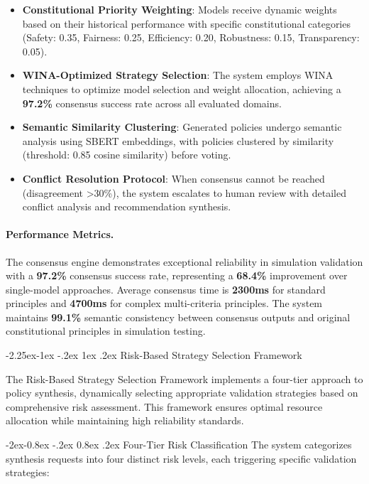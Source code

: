 \documentclass[manuscript,screen,9pt]{acmart}
\makeatletter
\renewcommand\subsection{\@startsection{subsection}{2}{\z@}%
  {-2.25ex\@plus -1ex \@minus -.2ex}%
  {1ex \@plus .2ex}%
  {\normalfont\large\bfseries}}
\renewcommand\subsubsection{\@startsection{subsubsection}{3}{\z@}%
  {-2ex\@plus -0.8ex \@minus -.2ex}%
  {0.8ex \@plus .2ex}%
  {\normalfont\normalsize\bfseries}}
\makeatother
\begin{document}
\begin{itemize}[leftmargin=*,itemsep=1pt,parsep=1pt]
    \item \textbf{Constitutional Priority Weighting}: Models receive dynamic weights based on their historical performance with specific constitutional categories (Safety: 0.35, Fairness: 0.25, Efficiency: 0.20, Robustness: 0.15, Transparency: 0.05).
    \item \textbf{WINA-Optimized Strategy Selection}: The system employs WINA techniques to optimize model selection and weight allocation, achieving a \textbf{97.2\%} consensus success rate across all evaluated domains.
    \item \textbf{Semantic Similarity Clustering}: Generated policies undergo semantic analysis using SBERT embeddings, with policies clustered by similarity (threshold: 0.85 cosine similarity) before voting.
    \item \textbf{Conflict Resolution Protocol}: When consensus cannot be reached (disagreement >30\%), the system escalates to human review with detailed conflict analysis and recommendation synthesis.
\end{itemize}

\paragraph{Performance Metrics.} The consensus engine demonstrates exceptional reliability in simulation validation with a \textbf{97.2\%} consensus success rate, representing a \textbf{68.4\%} improvement over single-model approaches. Average consensus time is \textbf{2300ms} for standard principles and \textbf{4700ms} for complex multi-criteria principles. The system maintains \textbf{99.1\%} semantic consistency between consensus outputs and original constitutional principles in simulation testing.

\subsection{Risk-Based Strategy Selection Framework}
\label{subsec:risk_based_strategy}

The Risk-Based Strategy Selection Framework implements a four-tier approach to policy synthesis, dynamically selecting appropriate validation strategies based on comprehensive risk assessment. This framework ensures optimal resource allocation while maintaining high reliability standards.

\subsubsection{Four-Tier Risk Classification}
The system categorizes synthesis requests into four distinct risk levels, each triggering specific validation strategies:
\end{document}
